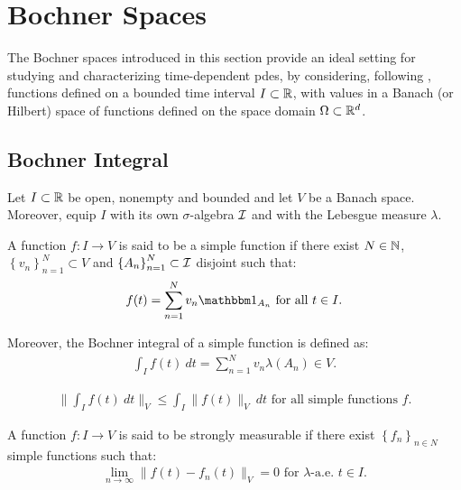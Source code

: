 \section{Bochner Spaces}

The Bochner spaces introduced in this section provide an ideal setting for studying and characterizing time-dependent \acrshort{pdes}, by considering, following \cite[p. 111]{Ern2021}, functions defined on a bounded time interval $I \subset \mathbb{R}$, with values in a Banach (or Hilbert) space of functions defined on the space domain $\Omega \subset \mathbb{R}^{d}$.

\subsection{Bochner Integral}

Let $I \subset \mathbb{R}$ be open, nonempty and bounded and let $V$ be a Banach space. Moreover, equip $I$ with its own $\sigma$-algebra $\mathcal{I}$ and with the Lebesgue measure $\lambda$.

\begin{definition}
    A function $f\colon I \rightarrow V$ is said to be a simple function if there exist $N \in \mathbb{N}$, $\left\{ v_n \right\}_{n = 1}^N \subset V$ and $\left\{ A_n \right\}_{n = 1}^N \subset \mathcal{I}$ disjoint such that:
    \begin{gather}
        f(t) = \sum_{n = 1}^N v_n \characteristic{A_n} \text{ for all } t \in I.
    \end{gather}

    Moreover, the Bochner integral of a simple function is defined as:
    \begin{gather}
        \int_I f(t) ~ dt  = \sum_{n = 1}^N v_n \lambda(A_n) \in V.
    \end{gather}
\end{definition}

\begin{lemma}
    \begin{gather}
        \lVert \int_I f(t) ~ dt \rVert_V \leq \int_I \lVert f(t) \rVert_V ~ dt \text{ for all simple functions } f.
    \end{gather}
\end{lemma}

\begin{definition}
    A function $f\colon I \rightarrow V$ is said to be strongly measurable if there exist $\left\{ f_n \right\}_{n \in N}$ simple functions such that:
    \begin{gather}
        \lim_{n \rightarrow \infty} \lVert f(t) - f_n(t) \rVert_V = 0 \text{ for } \lambda \text{-a.e. } t \in I.
    \end{gather}
\end{definition}


